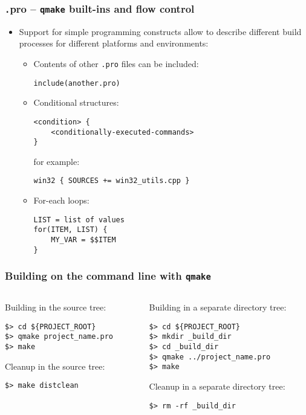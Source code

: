 \begin{frame}[fragile]
  \frametitle{{\texttt .pro} -- \texttt{qmake} built-ins and flow control}
  \small
  \begin{itemize}
    \item Support for simple programming constructs allow to describe different
      build processes for different platforms and environments:
      \begin{itemize}
      \item Contents of other \texttt{.pro} files can be included:
\begin{verbatim}
include(another.pro)
\end{verbatim}
      \item Conditional structures:
\begin{verbatim}
<condition> {
    <conditionally-executed-commands>
}
\end{verbatim} for example:
\begin{verbatim}
win32 { SOURCES += win32_utils.cpp }
\end{verbatim}
      \item For-each loops:
\begin{verbatim}
LIST = list of values
for(ITEM, LIST) {
    MY_VAR = $$ITEM
}
\end{verbatim}
      \end{itemize}
  \end{itemize}
\end{frame}

\begin{frame}[fragile]
  \frametitle{Building on the command line with \texttt{qmake}}
  \begin{columns}
    \begin{column}[t]{0.47\textwidth}
      Building in the source tree:
      \begin{verbatim}
$> cd ${PROJECT_ROOT}
$> qmake project_name.pro
$> make
      \end{verbatim}
      Cleanup in the source tree:
      \begin{verbatim}
$> make distclean
      \end{verbatim}
    \end{column}
    \begin{column}[t]{0.53\textwidth}
      Building in a separate directory tree:
      \begin{verbatim}
$> cd ${PROJECT_ROOT}
$> mkdir _build_dir
$> cd _build_dir
$> qmake ../project_name.pro
$> make
      \end{verbatim}
      Cleanup in a separate directory tree:
      \begin{verbatim}
$> rm -rf _build_dir
      \end{verbatim}
    \end{column}
  \end{columns}
\end{frame}

